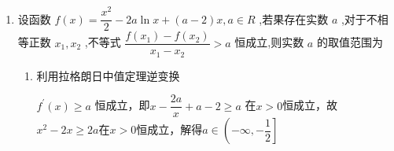 \begin{enumerate}
\begin{enumerate}
\begin{jieda}
\begin{enumerate}
                故$F(x) = f(x)-2x$在$[1, 2]$内为减函数，故$F'(x) = 3x^2+2ax \leq 0$在$[1, 2]$恒成立，即$a \leq \dfrac{3x}{2}$在 $\left\lbrack  {1,2}\right\rbrack$ 上恒成立
                $\therefore a =  - 3$
            \end{enumerate}
            \ps 拉格朗日中值定理：如果 $f\left( x\right)$ 满足在闭区间 $\left\lbrack  {a,b}\right\rbrack$ 上连续，在开区间$(a,b)$内可导，则至少有一点($a<\xi<b$),使等式 $\dfrac{f\left( b\right)  - f\left( a\right) }{b - a} = f'\left( \xi\right)$成立；即每一条割线都能找到与之平行的切线.

            拉格朗日中值定理不存在逆定理，即并非每一条切线都能找到与之平行的割线，如$y = x^3$在$x = 0$的切线则不存在与之平行的割线

            如果 $f\left( x\right)$ 满足在闭区间 $\left\lbrack  {a,b}\right\rbrack$ 上连续，在开区间$(a,b)$内可导（存在二阶导）则在$\left\lbrack  {a,b}\right\rbrack$内端点和拐点（凹凸性改变的点，通常为二阶导变号零点）处，使得导函数取得最值的位置的切线找不到与之平行的割线（不考虑局部线性的特殊情况）.

            故在填选中，可以进行如下转化：
        \end{jieda}
    
        \item 设函数 $f\left( x\right)  = \dfrac{{x}^{2}}{2} - {2a}\ln x + \left( {a - 2}\right) x,a \in  R$ ,若果存在实数 $a$ ,对于不相等正数 ${x}_{1},{x}_{2}$ ,不等式 $\dfrac{f\left( {x}_{1}\right)  - f\left( {x}_{2}\right) }{{x}_{1} - {x}_{2}} > a$ 恒成立,则实数 $a$ 的取值范围为\blkda{$\left(-\infty, -\dfrac{1}{2}\right]$}
        \begin{jieda}
            \begin{enumerate}
                \item 利用拉格朗日中值定理逆变换

                $ {f}^{\prime }\left( x\right)  \geq  a$ 恒成立，即$x-\dfrac{2a}{x}+a-2 \geq  a$ 在$x > 0$恒成立，故$x^2-2x \geq 2a$在$x > 0$恒成立，解得$a \in \left(-\infty, -\dfrac{1}{2}\right]$


\end{enumerate}
\end{jieda}
\end{enumerate}
\end{enumerate}
